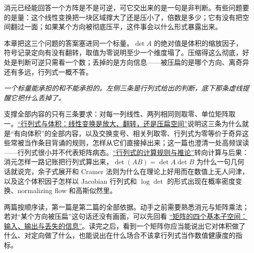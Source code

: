 消元已经能回答一个方阵是不是可逆，可它交出来的是一句是非判断。有些问题要的是量：这个线性变换把一块区域撑大了还是压小了，倍数是多少；它有没有把空间翻过一面；如果某个方向被彻底压平，这件事会以什么形式暴露出来。

本章把这三个问题的答案塞进同一个标量。\(\det A\) 的绝对值是体积的缩放因子，符号记录定向有没有翻转，取值为零说明至少一个维度塌了。压缩得这么彻底，好处是判断可逆只需看一个数；丢掉的是方向信息——被压扁的是哪个方向、离奇异还有多远，行列式一概不答。

\begin{center}

\emph{一个标量能承担的和不能承担的。左侧三条是行列式给出的判断，底下那条虚线提醒它把什么丢掉了。}
\end{center}

支撑全部内容的只有三条要求：对每一列线性、两列相同则取零、单位矩阵取一。\hyperref[sec:03-Linear-Algebra/04-Determinants/01]{``行列式与体积：线性变换是放大、翻转，还是压扁空间''}说明这三条为什么就是``有向体积''的全部内容，以及交换变号、相关列取零、行列式为零等价于奇异这些常被当作条目背诵的规则，怎样从它们直接掉出来；这一篇也澄清一处高频误读——行列式很小并不代表矩阵病态。\hyperref[sec:03-Linear-Algebra/04-Determinants/02]{``行列式的计算规则与推论''}转向计算与后果：消元怎样一路记账把行列式算出来，\(\det(AB)=\det A\det B\) 为什么一句几何话就说完，余子式展开和 Cramer 法则为什么在理论上好用而在数值上无人问津，以及这个体积因子怎样以 Jacobian 行列式和 \(\log\det\) 的形式出现在概率密度变换、normalizing flow 和高斯似然里。

两篇按顺序读，第一篇是第二篇的全部依据。动手之前需要熟悉消元与矩阵乘法；若对``某个方向被压扁''这句话还没有画面，可以先回看 \hyperref[sec:03-Linear-Algebra/02-Vector-Spaces/03]{``矩阵的四个基本子空间：输入、输出与丢失的信息''}。读完之后，看到一个矩阵你应当能说出它对体积做了什么、对定向做了什么，也能说出在什么场合不该拿行列式当作数值健康度的指标。
